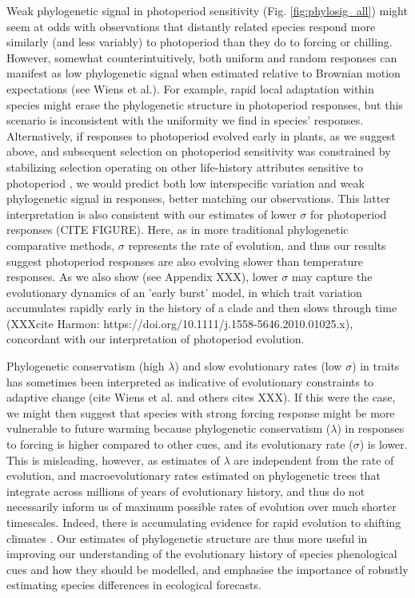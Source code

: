 \documentclass{article}\usepackage[]{graphicx}\usepackage[]{color}
\begin{document}
Weak phylogenetic signal in photoperiod sensitivity (Fig. \ref{fig:phylosig_all}) might seem at odds with observations that distantly related species respond more similarly (and less variably) to photoperiod than they do to forcing or chilling. However, somewhat counterintuitively, both uniform and random responses can manifest as low phylogenetic signal when estimated relative to Brownian motion expectations (see Wiens et al.). For example, rapid local adaptation within species might erase the phylogenetic structure in photoperiod responses, but this scenario is inconsistent with the uniformity we find in species' responses. Alternatively, if responses to photoperiod evolved early in plants, as we suggest above, and subsequent selection on photoperiod sensitivity was constrained by stabilizing selection operating on other life-history attributes sensitive to photoperiod \citep[e.g.,][]{Rinne:1994,Wilczek2014,azeez2015}, we would predict both low interspecific variation and weak phylogenetic signal in responses, better matching our observations. This latter interpretation is also consistent with our estimates of lower $\sigma$ for photoperiod responses (CITE FIGURE). Here, as in more traditional phylogenetic comparative methods, $\sigma$ represents the rate of evolution, and thus our results suggest photoperiod responses are also evolving slower than temperature responses. As we also show (see Appendix XXX), lower $\sigma$ may capture the evolutionary dynamics of an 'early burst' model, in which trait variation accumulates rapidly early in the history of a clade and then slows through time (XXXcite Harmon: https://doi.org/10.1111/j.1558-5646.2010.01025.x), concordant with our interpretation of photoperiod evolution.

Phylogenetic conservatism (high $\lambda$) and slow evolutionary rates (low $\sigma$) in traits has sometimes been interpreted as indicative of evolutionary constraints to adaptive change (cite Wiens et al. and others cites XXX). If this were the case, we might then suggest that species with strong forcing response might be more vulnerable to future warming because phylogenetic conservatism ($\lambda$) in responses to forcing is higher compared to other cues, and its evolutionary rate ($\sigma$) is lower. This is misleading, however, as estimates of $\lambda$ are independent from the rate of evolution, and macroevolutionary rates estimated on phylogenetic trees that integrate across millions of years of evolutionary history, and thus do not necessarily inform us of maximum possible rates of evolution over much shorter timescales. Indeed, there is accumulating evidence for rapid evolution to shifting climates \citep{bradshaw2006,franks2014}. Our estimates of phylogenetic structure are thus more useful in improving our understanding of the evolutionary history of species phenological cues and how they should be modelled, and emphasise the importance of robustly estimating species differences in ecological forecasts. %
\end{document}
